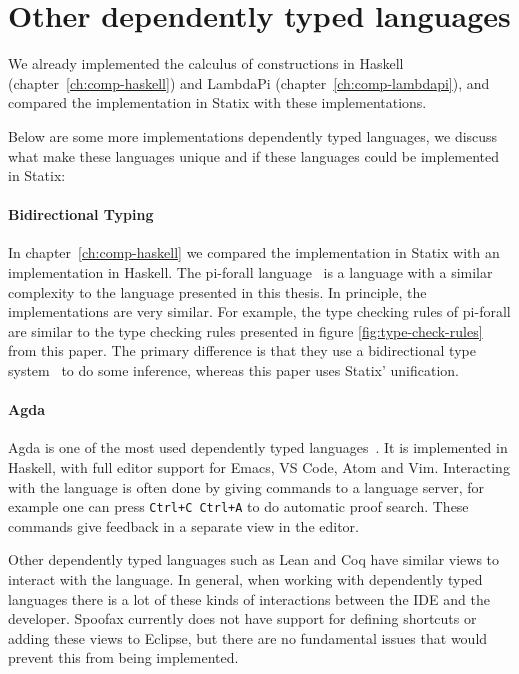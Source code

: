 \section{Other dependently typed languages}

We already implemented the calculus of constructions in Haskell (chapter~\ref{ch:comp-haskell}) and LambdaPi (chapter~\ref{ch:comp-lambdapi}), and compared the implementation in Statix with these implementations. 

Below are some more implementations dependently typed languages, we discuss what make these languages unique and if these languages could be implemented in Statix: 

\paragraph{Bidirectional Typing}

In chapter~\ref{ch:comp-haskell} we compared the implementation in Statix with an implementation in Haskell. The pi-forall language~\cite{pi_forall} is a language with a similar complexity to the language presented in this thesis. In principle, the implementations are very similar. For example, the type checking rules of pi-forall are similar to the type checking rules presented in figure \ref{fig:type-check-rules} from this paper. The primary difference is that they use a bidirectional type system~\cite{bidirectional} to do some inference, whereas this paper uses Statix' unification. 

\paragraph{Agda}

Agda is one of the most used dependently typed languages~\cite{agda}. It is implemented in Haskell, with full editor support for Emacs, VS Code, Atom and Vim. Interacting with the language is often done by giving commands to a language server, for example one can press \verb|Ctrl+C Ctrl+A| to do automatic proof search. These commands give feedback in a separate view in the editor. 

Other dependently typed languages such as Lean and Coq have similar views to interact with the language. In general, when working with dependently typed languages there is a lot of these kinds of interactions between the IDE and the developer. Spoofax currently does not have support for defining shortcuts or adding these views to Eclipse, but there are no fundamental issues that would prevent this from being implemented.  


